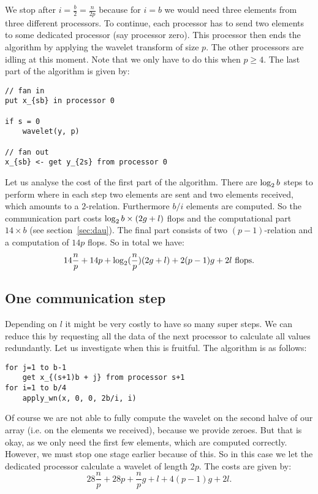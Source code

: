 We stop after $i=\frac{b}{2}=\frac{n}{2p}$ because for $i=b$ we would need three elements from three different processors. To continue, each processor has to send two elements to some dedicated processor (say processor zero). This processor then ends the algorithm by applying the wavelet transform of size $p$. The other processors are idling at this moment. Note that we only have to do this when $p \geq 4$. The last part of the algorithm is given by:

\begin{lstlisting}
// fan in
put x_{sb} in processor 0

if s = 0
	wavelet(y, p)

// fan out
x_{sb} <- get y_{2s} from processor 0
\end{lstlisting}

Let us analyse the cost of the first part of the algorithm. There are $\operatorname{\log_2}{b}$ steps to perform where in each step two elements are sent and two elements received, which amounts to a $2$-relation. Furthermore $b/i$ elements are computed. So the communication part costs $\operatorname{\log_2}{b}\times(2g+l)$ flops and the computational part $14 \times b$ (see section~\ref{sec:dau}). The final part consists of two $(p-1)$-relation and a computation of $14p$ flops. So in total we have:
\[ 14\frac{n}{p} + 14p + \operatorname{\log_2}(\frac{n}{p})(2g + l) + 2(p-1)g + 2l \text{ flops}.\]


\subsection{One communication step}
Depending on $l$ it might be very costly to have so many super steps. We can reduce this by requesting all the data of the next processor to calculate all values redundantly. Let us investigate when this is fruitful. The algorithm is as follows:

\begin{lstlisting}
for j=1 to b-1
	get x_{(s+1)b + j} from processor s+1
for i=1 to b/4
	apply_wn(x, 0, 0, 2b/i, i)
\end{lstlisting}

Of course we are not able to fully compute the wavelet on the second halve of our array (i.e. on the elements we received), because we provide zeroes. But that is okay, as we only need the first few elements, which are computed correctly. However, we must stop one stage earlier because of this. So in this case we let the dedicated processor calculate a wavelet of length $2p$. The costs are given by:
\[ 28\frac{n}{p} + 28p + \frac{n}{p}g + l + 4(p-1)g + 2l. \]

